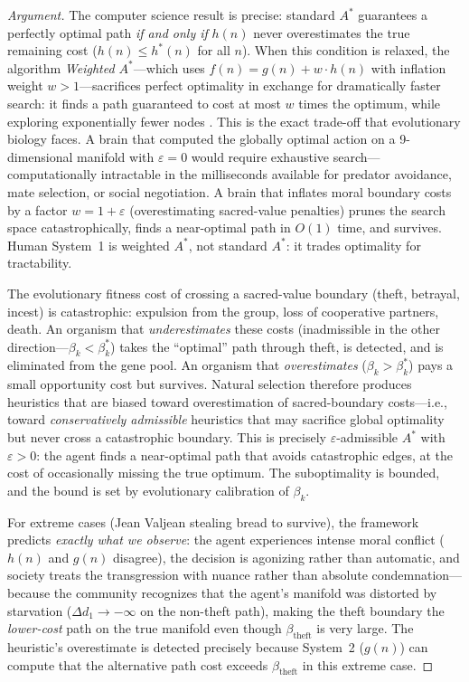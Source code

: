 \documentclass[12pt]{article}
\theoremstyle{definition}
\theoremstyle{remark}
\begin{document}
\begin{proof}[Argument]
The computer science result is precise: standard $A^*$ guarantees a perfectly optimal path \emph{if and only if} $h(n)$ never overestimates the true remaining cost ($h(n) \leq h^*(n)$ for all $n$).  When this condition is relaxed, the algorithm \emph{Weighted $A^*$}---which uses $f(n) = g(n) + w \cdot h(n)$ with inflation weight $w > 1$---sacrifices perfect optimality in exchange for dramatically faster search: it finds a path guaranteed to cost at most $w$ times the optimum, while exploring exponentially fewer nodes \cite{hart1968}.  This is the exact trade-off that evolutionary biology faces.  A brain that computed the globally optimal action on a 9-dimensional manifold with $\varepsilon = 0$ would require exhaustive search---computationally intractable in the milliseconds available for predator avoidance, mate selection, or social negotiation.  A brain that inflates moral boundary costs by a factor $w = 1 + \varepsilon$ (overestimating sacred-value penalties) prunes the search space catastrophically, finds a near-optimal path in $O(1)$ time, and survives.  Human System~1 is weighted $A^*$, not standard $A^*$: it trades optimality for tractability.

The evolutionary fitness cost of crossing a sacred-value boundary (theft, betrayal, incest) is catastrophic: expulsion from the group, loss of cooperative partners, death.  An organism that \emph{underestimates} these costs (inadmissible in the other direction---$\beta_k < \beta_k^*$) takes the ``optimal'' path through theft, is detected, and is eliminated from the gene pool.  An organism that \emph{overestimates} ($\beta_k > \beta_k^*$) pays a small opportunity cost but survives.  Natural selection therefore produces heuristics that are biased toward overestimation of sacred-boundary costs---i.e., toward \emph{conservatively admissible} heuristics that may sacrifice global optimality but never cross a catastrophic boundary.  This is precisely $\varepsilon$-admissible $A^*$ with $\varepsilon > 0$: the agent finds a near-optimal path that avoids catastrophic edges, at the cost of occasionally missing the true optimum.  The suboptimality is bounded, and the bound is set by evolutionary calibration of $\beta_k$.

For extreme cases (Jean Valjean stealing bread to survive), the framework predicts \emph{exactly what we observe}: the agent experiences intense moral conflict ($h(n)$ and $g(n)$ disagree), the decision is agonizing rather than automatic, and society treats the transgression with nuance rather than absolute condemnation---because the community recognizes that the agent's manifold was distorted by starvation ($\Delta d_1 \to -\infty$ on the non-theft path), making the theft boundary the \emph{lower-cost} path on the true manifold even though $\beta_{\text{theft}}$ is very large.  The heuristic's overestimate is detected precisely because System~2 ($g(n)$) can compute that the alternative path cost exceeds $\beta_{\text{theft}}$ in this extreme case.
\end{proof}
\end{document}
